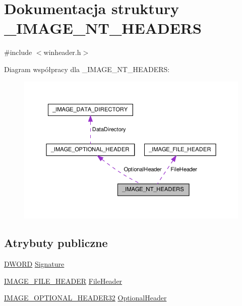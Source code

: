 \hypertarget{struct___i_m_a_g_e___n_t___h_e_a_d_e_r_s}{\section{Dokumentacja struktury \-\_\-\-I\-M\-A\-G\-E\-\_\-\-N\-T\-\_\-\-H\-E\-A\-D\-E\-R\-S}
\label{struct___i_m_a_g_e___n_t___h_e_a_d_e_r_s}
}


{\ttfamily \#include $<$winheader.\-h$>$}



Diagram współpracy dla \-\_\-\-I\-M\-A\-G\-E\-\_\-\-N\-T\-\_\-\-H\-E\-A\-D\-E\-R\-S\-:\nopagebreak
\begin{figure}[H]
\begin{center}
\leavevmode
\includegraphics[width=350pt]{struct___i_m_a_g_e___n_t___h_e_a_d_e_r_s__coll__graph}
\end{center}
\end{figure}
\subsection*{Atrybuty publiczne}
\begin{DoxyCompactItemize}
\item 
\hyperlink{winheader_8h_af483253b2143078cede883fc3c111ad2}{D\-W\-O\-R\-D} \hyperlink{struct___i_m_a_g_e___n_t___h_e_a_d_e_r_s_a0fab671e499d3d3f47db0a30b8369f80}{Signature}
\item 
\hyperlink{winheader_8h_ab18994ab54fdb55d1542f30b3895ab10}{I\-M\-A\-G\-E\-\_\-\-F\-I\-L\-E\-\_\-\-H\-E\-A\-D\-E\-R} \hyperlink{struct___i_m_a_g_e___n_t___h_e_a_d_e_r_s_ab8aa7ee8ecc7b35fecc1b99b57fc9817}{File\-Header}
\item 
\hyperlink{winheader_8h_a3a446b0141b509f024b0238113b7f410}{I\-M\-A\-G\-E\-\_\-\-O\-P\-T\-I\-O\-N\-A\-L\-\_\-\-H\-E\-A\-D\-E\-R32} \hyperlink{struct___i_m_a_g_e___n_t___h_e_a_d_e_r_s_a71de2ed0819a8fac537db2e9daedfe05}{Optional\-Header}
\end{DoxyCompactItemize}



